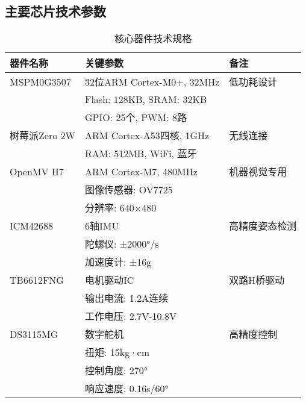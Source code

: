 \documentclass[UTF-8,zihao=-4]{ctexart}
\begin{document}
\subsection{主要芯片技术参数}
\begin{table}[H]
    \centering
    \caption{核心器件技术规格}
    \label{tab:specs}
    \begin{tabular}{lll}
        \toprule
        器件名称 & 关键参数 & 备注 \\
        \midrule
        MSPM0G3507 & 32位ARM Cortex-M0+, 32MHz & 低功耗设计 \\
        & Flash: 128KB, SRAM: 32KB & \\
        & GPIO: 25个, PWM: 8路 & \\
        \midrule
        树莓派Zero 2W & ARM Cortex-A53四核, 1GHz & 无线连接 \\
        & RAM: 512MB, WiFi, 蓝牙 & \\
        \midrule
        OpenMV H7 & ARM Cortex-M7, 480MHz & 机器视觉专用 \\
        & 图像传感器: OV7725 & \\
        & 分辨率: 640×480 & \\
        \midrule
        ICM42688 & 6轴IMU & 高精度姿态检测 \\
        & 陀螺仪: ±2000°/s & \\
        & 加速度计: ±16g & \\
        \midrule
        TB6612FNG & 电机驱动IC & 双路H桥驱动 \\
        & 输出电流: 1.2A连续 & \\
        & 工作电压: 2.7V-10.8V & \\
        \midrule
        DS3115MG & 数字舵机 & 高精度控制 \\
        & 扭矩: 15kg·cm & \\
        & 控制角度: 270° & \\
        & 响应速度: 0.16s/60° & \\
        \bottomrule
    \end{tabular}
\end{table}
\end{document}

